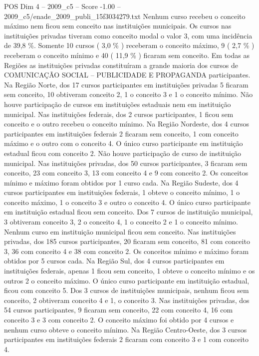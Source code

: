 \begin{textsample}{POS Dim 4 – 2009\_c5 – Score -1.00 – 2009\_c5/enade\_2009\_publi\_15f3034279.txt}
Nenhum curso recebeu o conceito máximo nem ficou sem conceito nas instituições municipais.
Os cursos nas instituições privadas tiveram como conceito modal o valor 3, com uma incidência de 39,8 \%.
Somente 10 cursos ( 3,0 \% ) receberam o conceito máximo, 9 ( 2,7 \% ) receberam o conceito mínimo e 40 ( 11,9 \% ) ficaram sem conceito.
Em todas as Regiões as instituições privadas constituíram a grande maioria dos cursos de COMUNICAÇÃO SOCIAL – PUBLICIDADE E PROPAGANDA participantes.
Na Região Norte, dos 17 cursos participantes em instituições privadas 5 ficaram sem conceito, 10 obtiveram conceito 2, 1 o conceito 3 e 1 o conceito mínimo.
Não houve participação de cursos em instituições estaduais nem em instituição municipal.
Nas instituições federais, dos 2 cursos participantes, 1 ficou sem conceito e o outro recebeu o conceito mínimo.
Na Região Nordeste, dos 4 cursos participantes em instituições federais 2 ficaram sem conceito, 1 com conceito máximo e o outro com o conceito 4.
O único curso participante em instituição estadual ficou com conceito 2.
Não houve participação de curso de instituição municipal.
Nas instituições privadas, dos 50 cursos participantes, 3 ficaram sem conceito, 23 com conceito 3, 13 com conceito 4 e 9 com conceito 2.
Os conceitos mínimo e máximo foram obtidos por 1 curso cada.
Na Região Sudeste, dos 4 cursos participantes em instituições federais, 1 obteve o conceito mínimo, 1 o conceito máximo, 1 o conceito 3 e outro o conceito 4.
O único curso participante em instituição estadual ficou sem conceito.
Dos 7 cursos de instituição municipal, 3 obtiveram conceito 3, 2 o conceito 4, 1 o conceito 2 e 1 o conceito mínimo.
Nenhum curso em instituição municipal ficou sem conceito.
Nas instituições privadas, dos 185 cursos participantes, 20 ficaram sem conceito, 81 com conceito 3, 36 com conceito 4 e 38 com conceito 2.
Os conceitos mínimo e máximo foram obtidos por 5 cursos cada.
Na Região Sul, dos 4 cursos participantes em instituições federais, apenas 1 ficou sem conceito, 1 obteve o conceito mínimo e os outros 2 o conceito máximo.
O único curso participante em instituição estadual, ficou com conceito 5.
Dos 3 cursos de instituições municipais, nenhum ficou sem conceito, 2 obtiveram conceito 4 e 1, o conceito 3.
Nas instituições privadas, dos 54 cursos participantes, 9 ficaram sem conceito, 22 com conceito 4, 16 com conceito 3 e 3 com conceito 2.
O conceito máximo foi obtido por 4 cursos e nenhum curso obteve o conceito mínimo.
Na Região Centro-Oeste, dos 3 cursos participantes em instituições federais 2 ficaram com conceito 3 e 1 com conceito 4.

\end{textsample}
